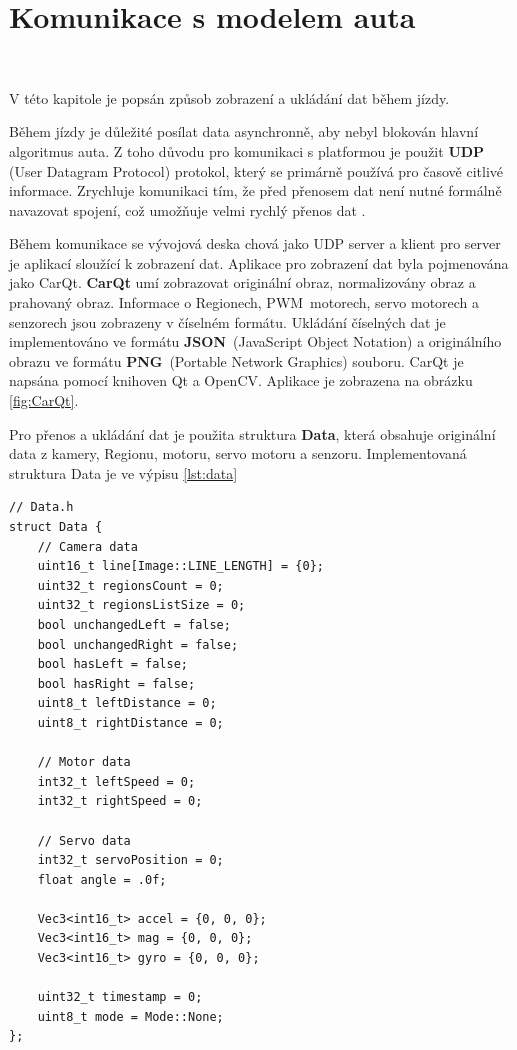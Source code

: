 \chapter{Komunikace s modelem auta}
\label{sec:PlatformCommunication}
\

V této kapitole je popsán způsob zobrazení a ukládání dat během jízdy.

Během jízdy je důležité posílat data asynchronně, aby nebyl blokován hlavní
algoritmus auta. Z toho důvodu pro komunikaci s platformou je použit \textbf{UDP}
(User Datagram Protocol) protokol, který se primárně používá pro časově citlivé
informace. Zrychluje komunikaci tím, že před přenosem dat není nutné formálně
navazovat spojení, což umožňuje velmi rychlý přenos dat \cite{UDP}.

Během komunikace se vývojová deska chová jako UDP server a klient pro server je
aplikací sloužící k zobrazení dat. Aplikace pro zobrazení dat byla pojmenována jako
CarQt. \textbf{CarQt} umí zobrazovat originální obraz, normalizovány obraz a
prahovaný obraz. Informace o Regionech, PWM~motorech, servo motorech a senzorech
jsou zobrazeny v číselném formátu. Ukládání číselných dat je implementováno ve
formátu \textbf{JSON}~(JavaScript Object Notation) a originálního obrazu ve formátu
\textbf{PNG}~(Portable Network Graphics) souboru. CarQt je napsána pomocí knihoven
Qt a OpenCV. Aplikace je zobrazena na obrázku \ref{fig:CarQt}.

Pro přenos a ukládání dat je použita struktura \textbf{Data}, která obsahuje
originální data z kamery, Regionu, motoru, servo motoru a senzoru.
Implementovaná struktura Data je ve výpisu \ref{lst:data}
\begin{lstlisting}[caption = Struktura Data, label = lst:data]
// Data.h
struct Data {
    // Camera data
    uint16_t line[Image::LINE_LENGTH] = {0};
    uint32_t regionsCount = 0;
    uint32_t regionsListSize = 0;
    bool unchangedLeft = false;
    bool unchangedRight = false;
    bool hasLeft = false;
    bool hasRight = false;
    uint8_t leftDistance = 0;
    uint8_t rightDistance = 0;

    // Motor data
    int32_t leftSpeed = 0;
    int32_t rightSpeed = 0;

    // Servo data
    int32_t servoPosition = 0;
    float angle = .0f;

    Vec3<int16_t> accel = {0, 0, 0};
    Vec3<int16_t> mag = {0, 0, 0};
    Vec3<int16_t> gyro = {0, 0, 0};

    uint32_t timestamp = 0;
    uint8_t mode = Mode::None;
};
\end{lstlisting}

